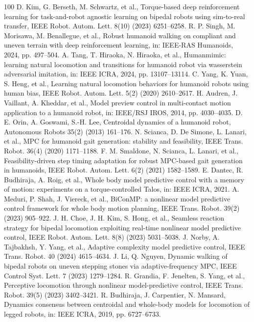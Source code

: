 \documentclass[5p,times]{elsarticle}
\begin{document}
\begin{thebibliography}{100}
 D. Kim, G. Berseth, M. Schwartz, et al., Torque-based deep reinforcement learning for task-and-robot agnostic learning on bipedal robots using sim-to-real transfer, IEEE Robot. Autom. Lett. 8(10) (2023) 6251--6258.
 R. P. Singh, M. Morisawa, M. Benallegue, et al., Robust humanoid walking on compliant and uneven terrain with deep reinforcement learning, in: IEEE-RAS Humanoids, 2024, pp. 497--504.
 A. Tang, T. Hiraoka, N. Hiraoka, et al., Humanmimic: learning natural locomotion and transitions for humanoid robot via wasserstein adversarial imitation, in: IEEE ICRA, 2024, pp. 13107--13114.
 C. Yang, K. Yuan, S. Heng, et al., Learning natural locomotion behaviors for humanoid robots using human bias, IEEE Robot. Autom. Lett. 5(2) (2020) 2610--2617.
 H. Audren, J. Vaillant, A. Kheddar, et al., Model preview control in multi-contact motion application to a humanoid robot, in: IEEE/RSJ IROS, 2014, pp. 4030--4035.
 D. E. Orin, A. Goswami, S.-H. Lee, Centroidal dynamics of a humanoid robot, Autonomous Robots 35(2) (2013) 161--176.
 N. Scianca, D. De Simone, L. Lanari, et al., MPC for humanoid gait generation: stability and feasibility, IEEE Trans. Robot. 36(4) (2020) 1171--1188.
 F. M. Smaldone, N. Scianca, L. Lanari, et al., Feasibility-driven step timing adaptation for robust MPC-based gait generation in humanoids, IEEE Robot. Autom. Lett. 6(2) (2021) 1582--1589.
 E. Dantec, R. Budhiraja, A. Roig, et al., Whole body model predictive control with a memory of motion: experiments on a torque-controlled Talos, in: IEEE ICRA, 2021.
 A. Meduri, P. Shah, J. Viereck, et al., BiConMP: a nonlinear model predictive control framework for whole body motion planning, IEEE Trans. Robot. 39(2) (2023) 905--922.
 J. H. Choe, J. H. Kim, S. Hong, et al., Seamless reaction strategy for bipedal locomotion exploiting real-time nonlinear model predictive control, IEEE Robot. Autom. Lett. 8(8) (2023) 5031--5038.
 J. Norby, A. Tajbakhsh, Y. Yang, et al., Adaptive complexity model predictive control, IEEE Trans. Robot. 40 (2024) 4615--4634.
 J. Li, Q. Nguyen, Dynamic walking of bipedal robots on uneven stepping stones via adaptive-frequency MPC, IEEE Control Syst. Lett. 7 (2023) 1279--1284.
 R. Grandia, F. Jenelten, S. Yang, et al., Perceptive locomotion through nonlinear model-predictive control, IEEE Trans. Robot. 39(5) (2023) 3402--3421.
 R. Budhiraja, J. Carpentier, N. Mansard, Dynamics consensus between centroidal and whole-body models for locomotion of legged robots, in: IEEE ICRA, 2019, pp. 6727--6733.

\end{thebibliography}
\end{document}
